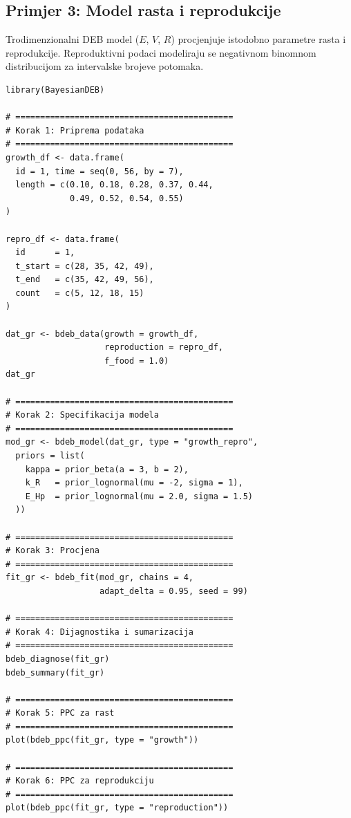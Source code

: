 \documentclass[11pt,a4paper]{article}
\begin{document}
\subsection{Primjer 3: Model rasta i reprodukcije}
\label{sec:primjer-repro}

Trodimenzionalni DEB model ($E$, $V$, $R$) procjenjuje istodobno
parametre rasta i reprodukcije.  Reproduktivni podaci modeliraju se
negativnom binomnom distribucijom za intervalske brojeve potomaka.

\begin{lstlisting}
library(BayesianDEB)

# ============================================
# Korak 1: Priprema podataka
# ============================================
growth_df <- data.frame(
  id = 1, time = seq(0, 56, by = 7),
  length = c(0.10, 0.18, 0.28, 0.37, 0.44,
             0.49, 0.52, 0.54, 0.55)
)

repro_df <- data.frame(
  id      = 1,
  t_start = c(28, 35, 42, 49),
  t_end   = c(35, 42, 49, 56),
  count   = c(5, 12, 18, 15)
)

dat_gr <- bdeb_data(growth = growth_df,
                    reproduction = repro_df,
                    f_food = 1.0)
dat_gr

# ============================================
# Korak 2: Specifikacija modela
# ============================================
mod_gr <- bdeb_model(dat_gr, type = "growth_repro",
  priors = list(
    kappa = prior_beta(a = 3, b = 2),
    k_R   = prior_lognormal(mu = -2, sigma = 1),
    E_Hp  = prior_lognormal(mu = 2.0, sigma = 1.5)
  ))

# ============================================
# Korak 3: Procjena
# ============================================
fit_gr <- bdeb_fit(mod_gr, chains = 4,
                   adapt_delta = 0.95, seed = 99)

# ============================================
# Korak 4: Dijagnostika i sumarizacija
# ============================================
bdeb_diagnose(fit_gr)
bdeb_summary(fit_gr)

# ============================================
# Korak 5: PPC za rast
# ============================================
plot(bdeb_ppc(fit_gr, type = "growth"))

# ============================================
# Korak 6: PPC za reprodukciju
# ============================================
plot(bdeb_ppc(fit_gr, type = "reproduction"))
\end{lstlisting}
\end{document}
